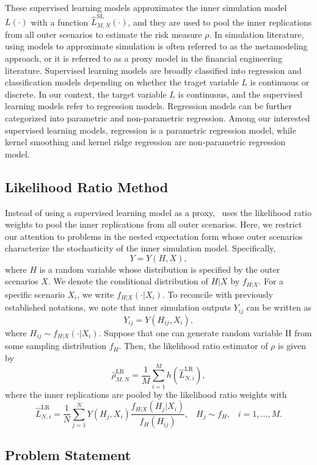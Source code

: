 These supervised learning models approximates the inner simulation model $L(\cdot)$ with a function $\hat{L}^{\text{SL}}_{M, N}(\cdot)$, and they are used to pool the inner replications from all outer scenarios to estimate the risk measure $\rho$.
In simulation literature, using models to approximate simulation is often referred to as the metamodeling approach, or it is referred to as a proxy model in the financial engineering literature.
Supervised learning models are broadly classified into regression and classification models depending on whether the traget variable $L$ is continuous or discrete.
In our context, the target variable $L$ is continuous, and the supervised learning models refer to regression models.
Regression models can be further categorized into parametric and non-parametric regression.
Among our interested supervised learning models, regression is a parametric regression model, while kernel smoothing and kernel ridge regression are non-parametric regression model.

\subsection{Likelihood Ratio Method}

Instead of using a supervised learning model as a proxy,~\cite{zhang2022sample} uses the likelihood ratio weights to pool the inner replications from all outer scenarios.
Here, we restrict our attention to problems in the nested expectation form whose outer scenarios characterize the stochasticity of the inner simulation model. 
Specifically,
$$ Y = Y(H, X), $$
where $H$ is a random variable whose distribution is specified by the outer scenarios $X$. 
We denote the conditional distribution of $H|X$ by $f_{H|X}$. 
For a specific scenario $X_i$, we write $f_{H|X}(\cdot |X_i)$. 
To reconcile with previously established notations, we note that inner simulation outputs $Y_{ij}$ can be written as
$$ Y_{ij} = Y(H_{ij}, X_i), $$
where $H_{ij} \sim f_{H|X}(\cdot |X_i)$.
Suppose that one can generate random variable H from some sampling
distribution $f_H$. Then, the likelihood ratio estimator of $\rho$ is given by
$$\hat{\rho}^{\text{LR}}_{M,N} = \frac{1}{M} \sum_{i=1}^M h(\hat{L}^{\text{LR}}_{N, i}), $$ where the inner replications are pooled by the likelihood ratio weights with
$$\hat{L}^{\text{LR}}_{N, i} = \frac{1}{N} \sum_{j=1}^N Y(H_j, X_i) \frac{f_{H|X}(H_{j}|X_i)}{f_H(H_{ij})}, \;\;\; H_j \sim f_H, \;\;\; i=1, \dots, M.$$

\subsection{Problem Statement}

